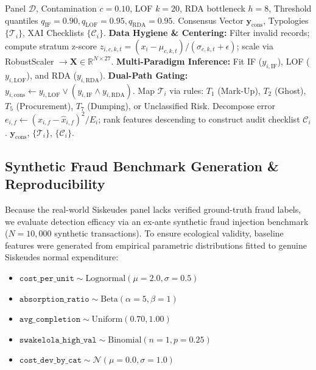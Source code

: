\documentclass[conference]{IEEEtran}
\begin{document}
\begin{algorithm}[htbp]
\caption{Dual-Path Anomaly Detection and XAI Policy Pipeline}
\label{alg:end_to_end}
\begin{algorithmic}[1]
\REQUIRE Panel $\mathcal{D}$, Contamination $c=0.10$, LOF $k=20$, RDA bottleneck $h=8$, Threshold quantiles $q_{\text{IF}}=0.90, q_{\text{LOF}}=0.95, q_{\text{RDA}}=0.95$.
\ENSURE Consensus Vector $\mathbf{y}_{\text{cons}}$, Typologies $\{\mathcal{T}_i\}$, XAI Checklists $\{\mathcal{C}_i\}$.
\STATE \textbf{Data Hygiene \& Centering:} Filter invalid records; compute stratum z-score $z_{i,c,k,t} = (x_i - \mu_{c,k,t})/(\sigma_{c,k,t}+\epsilon)$; scale via RobustScaler $\to \mathbf{X} \in \mathbb{R}^{N \times 27}$.
\STATE \textbf{Multi-Paradigm Inference:} Fit IF ($y_{i,\text{IF}}$), LOF ($y_{i,\text{LOF}}$), and RDA ($y_{i,\text{RDA}}$).
\STATE \textbf{Dual-Path Gating:} $y_{i, \text{cons}} \leftarrow y_{i, \text{LOF}} \lor (y_{i, \text{IF}} \land y_{i, \text{RDA}})$.
    \STATE Map $\mathcal{T}_i$ via rules: $T_1$ (Mark-Up), $T_2$ (Ghost), $T_5$ (Procurement), $T_7$ (Dumping), or Unclassified Risk.
    \STATE Decompose error $e_{i,f} \leftarrow (x_{i,f} - \hat{x}_{i,f})^2 / E_i$; rank features descending to construct audit checklist $\mathcal{C}_i$.
\ENDFOR
\RETURN $\mathbf{y}_{\text{cons}}$, $\{\mathcal{T}_i\}$, $\{\mathcal{C}_i\}$.
\end{algorithmic}
\end{algorithm}

\subsection{Synthetic Fraud Benchmark Generation & Reproducibility}

Because the real-world Siskeudes panel lacks verified ground-truth fraud labels, we evaluate detection efficacy via an ex-ante synthetic fraud injection benchmark ($N = 10,000$ synthetic transactions). To ensure ecological validity, baseline features were generated from empirical parametric distributions fitted to genuine Siskeudes normal expenditure:
\begin{itemize}
    \item $\texttt{cost\_per\_unit} \sim \text{Lognormal}(\mu=2.0, \sigma=0.5)$
    \item $\texttt{absorption\_ratio} \sim \text{Beta}(\alpha=5, \beta=1)$
    \item $\texttt{avg\_completion} \sim \text{Uniform}(0.70, 1.00)$
    \item $\texttt{swakelola\_high\_val} \sim \text{Binomial}(n=1, p=0.25)$
    \item $\texttt{cost\_dev\_by\_cat} \sim \mathcal{N}(\mu=0.0, \sigma=1.0)$
\end{itemize}
\end{document}
